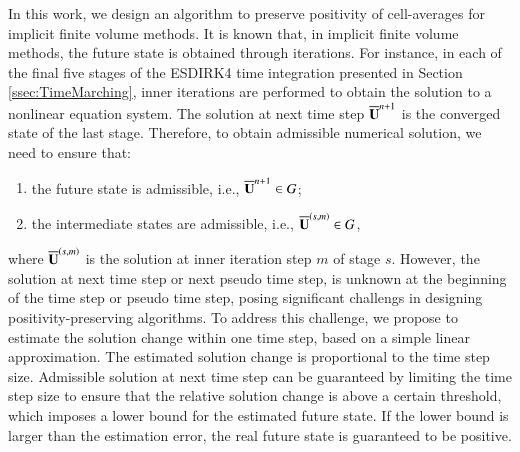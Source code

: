 In this work, we design an algorithm to preserve positivity of cell-averages for implicit finite volume methods. It is known that, in implicit finite volume methods, the future state is obtained through iterations. For instance, in each of the final five stages of the ESDIRK4 time integration presented in Section \ref{ssec:TimeMarching}, inner iterations are performed to obtain the solution to a nonlinear equation system. The solution at next time step $\overline{\mathbf{U}}^{n+1}$ is the converged state of the last stage. Therefore, to obtain admissible numerical solution, we need to ensure that:
\begin{enumerate}[label=(\alph*)]
    \item the future state is admissible, i.e., $\overline{\mathbf{U}}^{n+1} \in G$;
    \item the intermediate states are admissible, i.e., $\overline{\mathbf{U}}^{\left(s,m\right)} \in G$,
\end{enumerate}
where $\overline{\mathbf{U}}^{\left(s,m\right)}$ is the solution at inner iteration step $m$ of stage $s$. However, the solution at next time step or next pseudo time step, is unknown at the beginning of the time step or pseudo time step, posing significant challengs in designing positivity-preserving algorithms. 
To address this challenge, we propose to estimate the solution change within one time step, based on a simple linear approximation. The estimated solution change is proportional to the time step size. Admissible solution at next time step can be guaranteed by limiting the time step size to ensure that the relative solution change is above a certain threshold, which imposes a lower bound for the estimated future state. If the lower bound is larger than the estimation error, the real future state is guaranteed to be positive.   

